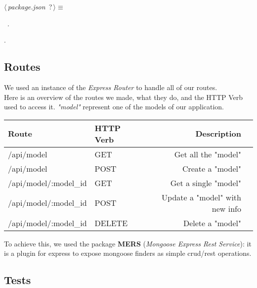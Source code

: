 	\begin{flushleft} \small
\begin{minipage}{\linewidth}\label{scrap2}\raggedright\small
{} $\langle\,${\itshape {package.json}}\nobreak\ {\footnotesize {?}}$\,\rangle\equiv$
\vspace{-1ex}
\begin{list}{}{} \item

                
        {\NWsep}
\end{list}
\vspace{-1.5ex}
\footnotesize
\begin{list}{}{\setlength{\itemsep}{-\parsep}\setlength{\itemindent}{-\leftmargin}}
\item \NWtxtMacroDefBy\ .
\item {\NWtxtMacroNoRef}.

\item{}
\end{list}
\end{minipage}\vspace{4ex}
\end{flushleft}
\subsection{Routes}

We used an instance of the \emph{Express Router} to handle all of our routes.
\\Here is an overview of the routes we made, what they do, and the HTTP Verb used to access it. \emph{"model"} represent one of the models of our application.

\vspace{5mm}

\begin{tabular}{|l|l|rl|}
\hline
Route          &		 HTTP Verb        &		 Description		&       \\
\hline
/api/model 		&	GET       &		Get all the "model"       &      	\\
/api/model		&	POST       & 	Create a "model"       &     		\\
/api/model/:model\_id 	&	GET       & 	Get a single "model"       &     	\\
/api/model/:model\_id		&	POST       & 	Update a "model" with new info       &     	\\
/api/model/:model\_id		&	DELETE       & 	Delete a "model"       &     	\\
\hline
\end{tabular}

\vspace{5mm}

To achieve this, we used the package \textbf{MERS} (\emph{Mongoose Express Rest Service}): it is a plugin for express to expose mongoose finders as simple crud/rest operations.

\subsection{Tests}